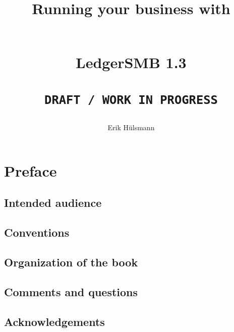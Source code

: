 \documentclass[10pt,A4]{book}
\begin{document}
\author{Erik H\"ulsmann}
\title{\begin{Large}
Running your business with
\end{Large} \\
LedgerSMB 1.3 \\
 ~ \\
\texttt{DRAFT / WORK IN PROGRESS} }


\maketitle


\tableofcontents



\chapter*{Preface}

\section*{Intended audience}
\section*{Conventions}
\section*{Organization of the book}
\section*{Comments and questions}
\section*{Acknowledgements}








\end{document}
